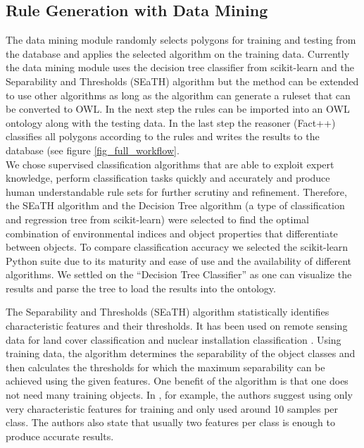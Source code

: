 \documentclass[authoryear, review,12pt,number]{elsarticle}
\begin{document}

\subsection{Rule Generation with Data Mining}
The data mining module randomly selects polygons for training and testing from
the database and applies the selected algorithm on the training data. 
%
Currently the data mining module uses the decision tree classifier from
scikit-learn \citep{scikit-learn} and the Separability and Thresholds (SEaTH)
algorithm \citep{Nussbaum2006} but the method can be extended to use other
algorithms as long as the algorithm can generate a ruleset that can be
converted to OWL. In the next step the rules can be imported into an OWL
ontology along with the testing data. In the last step the reasoner (Fact++)
classifies all polygons according to the rules and writes the results to the
database (see figure \ref{fig_full_workflow}.
\\
We chose supervised classification algorithms that
are able to exploit expert knowledge, perform classification tasks quickly and
accurately and produce human understandable rule sets for further scrutiny and
refinement. Therefore, the SEaTH algorithm and the Decision Tree algorithm (a
type of classification and regression tree from scikit-learn) were selected to
find the optimal combination of environmental indices and object properties
that differentiate between objects.  To compare classification accuracy we
selected the scikit-learn Python suite \citep{scikit-learn} due to its maturity
and ease of use and the availability of different algorithms. We settled on the
``Decision Tree Classifier'' as one can visualize the results and parse the
tree to load the results into the ontology.  

The Separability and Thresholds (SEaTH) algorithm \citep{Nussbaum2006}
statistically identifies characteristic features and their thresholds. It has
been used on remote sensing data for land cover classification \citep{Gao2011}
and nuclear installation classification \citep{Nussbaum2006}. Using training
data, the algorithm determines the separability of the object classes and then
calculates the thresholds for which the maximum separability can be achieved
using the given features. One benefit of the algorithm is that one does not
need many training objects.  In  \cite{Nussbaum2006}, for example, the authors
suggest using only very characteristic features for training and only used
around 10 samples per class. The authors also state that usually two features
per class is enough to produce accurate results.\\
\end{document}
